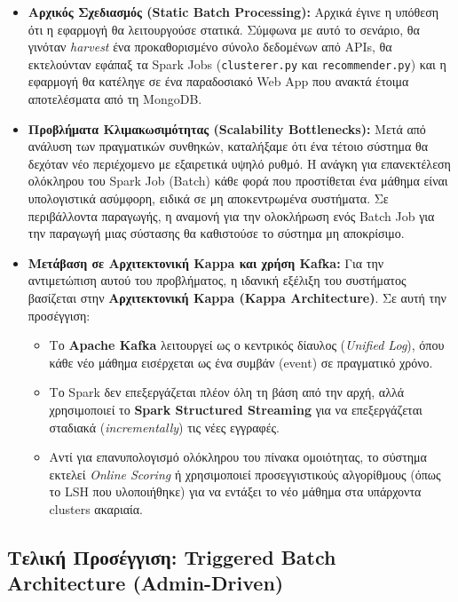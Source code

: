 \documentclass[a4paper,12pt]{article}
\begin{document}
\begin{itemize} 
    \item \textbf{Αρχικός Σχεδιασμός (Static Batch Processing):} Αρχικά έγινε η υπόθεση ότι η εφαρμογή θα λειτουργούσε στατικά. Σύμφωνα με αυτό το σενάριο, θα γινόταν \textit{harvest} ένα προκαθορισμένο σύνολο δεδομένων από APIs, θα εκτελούνταν εφάπαξ τα Spark Jobs (\texttt{clusterer.py} και \texttt{recommender.py}) και η εφαρμογή θα κατέληγε σε ένα παραδοσιακό Web App που ανακτά έτοιμα αποτελέσματα από τη MongoDB.

    \item \textbf{Προβλήματα Κλιμακωσιμότητας (Scalability Bottlenecks):} 
    Μετά από ανάλυση των πραγματικών συνθηκών, καταλήξαμε ότι ένα τέτοιο σύστημα θα δεχόταν νέο περιέχομενο με εξαιρετικά υψηλό ρυθμό. Η ανάγκη για επανεκτέλεση ολόκληρου του Spark Job (Batch) κάθε φορά που προστίθεται ένα μάθημα είναι υπολογιστικά ασύμφορη, ειδικά σε μη αποκεντρωμένα συστήματα. Σε περιβάλλοντα παραγωγής, η αναμονή για την ολοκλήρωση ενός Batch Job για την παραγωγή μιας σύστασης θα καθιστούσε το σύστημα μη αποκρίσιμο.

    \item \textbf{Μετάβαση σε Αρχιτεκτονική Kappa και χρήση Kafka:} 
    Για την αντιμετώπιση αυτού του προβλήματος, η ιδανική εξέλιξη του συστήματος βασίζεται στην \textbf{Αρχιτεκτονική Kappa (Kappa Architecture)}. Σε αυτή την προσέγγιση:
    \begin{itemize}
        \item Το \textbf{Apache Kafka} λειτουργεί ως ο κεντρικός δίαυλος (\textit{Unified Log}), όπου κάθε νέο μάθημα εισέρχεται ως ένα συμβάν (event) σε πραγματικό χρόνο.
        \item Το Spark δεν επεξεργάζεται πλέον όλη τη βάση από την αρχή, αλλά χρησιμοποιεί το \textbf{Spark Structured Streaming} για να επεξεργάζεται σταδιακά (\textit{incrementally}) τις νέες εγγραφές.
        \item Αντί για επανυπολογισμό ολόκληρου του πίνακα ομοιότητας, το σύστημα εκτελεί \textit{Online Scoring} ή χρησιμοποιεί προσεγγιστικούς αλγορίθμους (όπως το LSH που υλοποιήθηκε) για να εντάξει το νέο μάθημα στα υπάρχοντα clusters ακαριαία.
    \end{itemize}
\end{itemize}

    \subsection{Τελική Προσέγγιση: Triggered Batch Architecture (Admin-Driven)}
\end{document}
